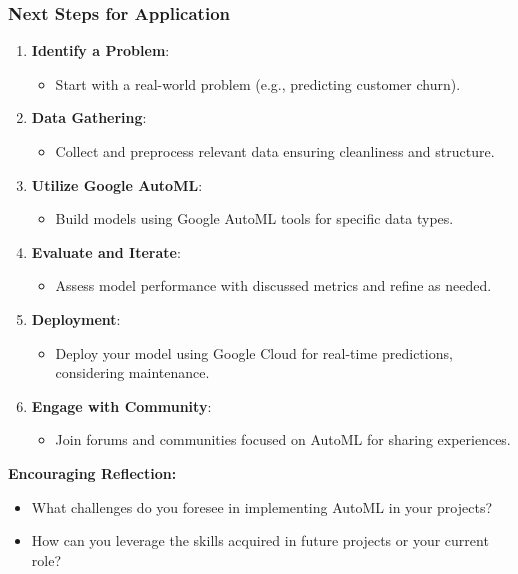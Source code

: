 \documentclass[aspectratio=169]{beamer}
\begin{document}
\begin{frame}[fragile]
  \frametitle{Next Steps for Application}

  \begin{enumerate}
      \item \textbf{Identify a Problem}:
          \begin{itemize}
              \item Start with a real-world problem (e.g., predicting customer churn).
          \end{itemize}

      \item \textbf{Data Gathering}:
          \begin{itemize}
              \item Collect and preprocess relevant data ensuring cleanliness and structure.
          \end{itemize}
      
      \item \textbf{Utilize Google AutoML}:
          \begin{itemize}
              \item Build models using Google AutoML tools for specific data types.
          \end{itemize}
      
      \item \textbf{Evaluate and Iterate}:
          \begin{itemize}
              \item Assess model performance with discussed metrics and refine as needed.
          \end{itemize}

      \item \textbf{Deployment}:
          \begin{itemize}
              \item Deploy your model using Google Cloud for real-time predictions, considering maintenance.
          \end{itemize}

      \item \textbf{Engage with Community}:
          \begin{itemize}
              \item Join forums and communities focused on AutoML for sharing experiences.
          \end{itemize}
  \end{enumerate}
  
  \textbf{Encouraging Reflection:} 
  \begin{itemize}
      \item What challenges do you foresee in implementing AutoML in your projects?
      \item How can you leverage the skills acquired in future projects or your current role? 
  \end{itemize}
\end{frame}
\end{document}
